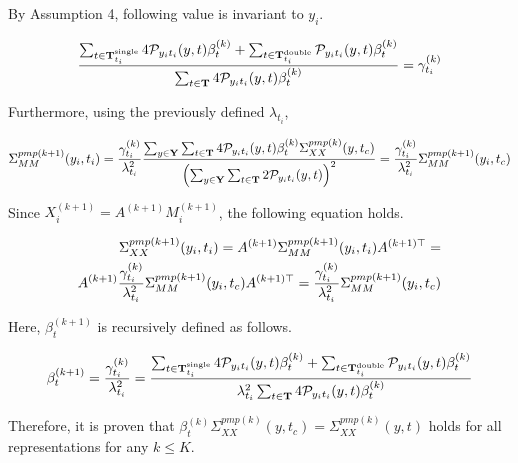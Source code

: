 By Assumption 4, following value is invariant to $y_i$.

\begin{align}
{\sum_{t\in\bold{T}_{t_i}^{\text{single}}}4\mathcal{P}_{y_i t_i}(y, t)\beta_t^{(k)}+\sum_{t\in\bold{T}_{t_i}^{\text{double}}}\mathcal{P}_{y_i t_i}(y, t)\beta_t^{(k)}\over \sum_{t\in\bold{T}}4\mathcal{P}_{y_i t_i}(y, t)\beta_t^{(k)}}=\gamma_{t_i}^{(k)}
\end{align}

Furthermore, using the previously defined $\lambda_{t_i}$,

\begin{align}
\Sigma^{pmp(k+1)}_{MM}(y_i,t_i) = {\gamma_{t_i}^{(k)}\over\lambda_{t_i}^2} {\sum_{y\in \bold{Y}}\sum_{t\in\bold{T}}4\mathcal{P}_{y_i t_i}(y, t)\beta_t^{(k)}\Sigma_{XX}^{pmp (k)}(y,t_{c})
\over
\left(\sum_{y\in \bold{Y}}\sum_{t\in\bold{T}}2\mathcal{P}_{y_i t_i}(y, t)\right)^2} = {\gamma_{t_i}^{(k)}\over\lambda_{t_i}^2} \Sigma^{pmp(k+1)}_{MM}(y_i,t_{c}) 
\end{align}

Since $X_i^{(k+1)}=A^{(k+1)}M_i^{(k+1)}$, the following equation holds.

\begin{align}
\Sigma^{pmp(k+1)}_{XX}(y_i,t_i)= A^{(k+1)}\Sigma^{pmp(k+1)}_{MM}(y_i,t_i)A^{(k+1)\top}=\\A^{(k+1)}{\gamma_{t_i}^{(k)}\over\lambda_{t_i}^2}\Sigma^{pmp(k+1)}_{MM}(y_i,t_{c})A^{(k+1)\top} ={\gamma_{t_i}^{(k)}\over\lambda_{t_i}^2} \Sigma^{pmp(k+1)}_{MM}(y_i,t_{c}) 
\end{align}

Here, $\beta_t^{(k+1)}$ is recursively defined as follows.

\begin{align}
\beta_t^{(k+1)} = {\gamma_{t_i}^{(k)}\over\lambda_{t_i}^2}={\sum_{t\in\bold{T}_{t_i}^{\text{single}}}4\mathcal{P}_{y_i t_i}(y, t)\beta_t^{(k)}+\sum_{t\in\bold{T}_{t_i}^{\text{double}}}\mathcal{P}_{y_i t_i}(y, t)\beta_t^{(k)}\over \lambda_{t_i}^2\sum_{t\in\bold{T}}4\mathcal{P}_{y_i t_i}(y, t)\beta_t^{(k)}}
\end{align}

Therefore, it is proven that $\beta_{t}^{(k)}\Sigma_{XX}^{pmp (k)}(y,t_{c})= \Sigma_{XX}^{pmp (k)}(y,t)$ holds for all representations for any $k\le K$.



